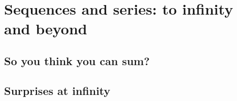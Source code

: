 \chapter{Sequences and series: to infinity and beyond}

\section{So you think you can sum?}

\section{Surprises at infinity}

